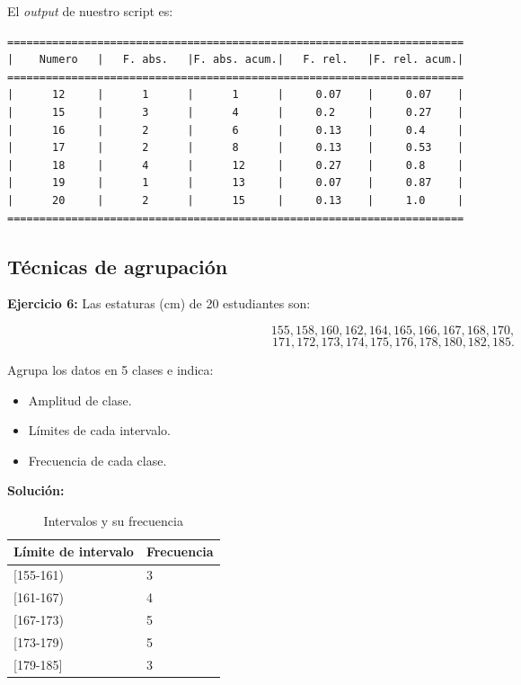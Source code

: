 \documentclass[12pt]{article}
\begin{document}
El \textit{output} de nuestro script es:
\begin{verbatim}
=======================================================================
|    Numero   |   F. abs.   |F. abs. acum.|   F. rel.   |F. rel. acum.|
=======================================================================
|      12     |      1      |      1      |     0.07    |     0.07    |
|      15     |      3      |      4      |     0.2     |     0.27    |
|      16     |      2      |      6      |     0.13    |     0.4     |
|      17     |      2      |      8      |     0.13    |     0.53    |
|      18     |      4      |      12     |     0.27    |     0.8     |
|      19     |      1      |      13     |     0.07    |     0.87    |
|      20     |      2      |      15     |     0.13    |     1.0     |
=======================================================================
\end{verbatim}

\subsection*{\centering Técnicas de agrupación}
\textbf{Ejercicio 6:} Las estaturas (cm) de 20 estudiantes son:

\[155, 158, 160, 162, 164, 165, 166, 167, 168, 170,\]
\[171, 172, 173, 174, 175, 176, 178, 180, 182, 185.\]

Agrupa los datos en 5 clases e indica:
\begin{itemize}
    \item Amplitud de clase.
    \item Límites de cada intervalo.
    \item Frecuencia de cada clase.
\end{itemize}

\textbf{Solución: }

\begin{table}[h!]
    \begin{center}
        \begin{tabular}{|l|l|}
            \hline
            Límite de intervalo & Frecuencia \\
            \hline
            {[}155-161) & 3 \\
            {[}161-167) & 4 \\
            {[}167-173) & 5 \\
            {[}173-179) & 5 \\
            {[}179-185{]} & 3 \\
            \hline
        \end{tabular}
        \caption{Intervalos y su frecuencia}
        \label{tab:tabla_clases}
    \end{center}
\end{table}
\end{document}
